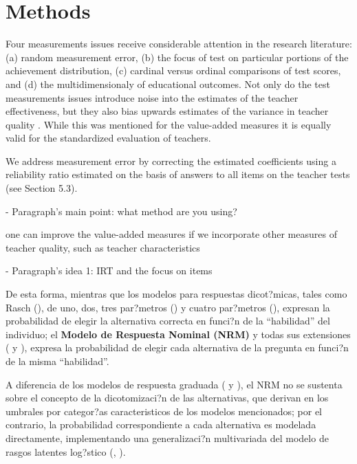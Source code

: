 \section{Methods}

Four measurements issues receive considerable attention in the research literature: (a) random measurement error, (b) the focus of test on particular portions of the achievement distribution, (c) cardinal versus ordinal comparisons of test scores, and (d) the multidimensionaly of educational outcomes. Not only do the test measurements issues introduce noise into the estimates of the teacher effectiveness, but they also bias upwards estimates of the variance in teacher quality \citep{Hanushek_et_al_2012}. While this was mentioned for the value-added measures it is equally valid for the standardized evaluation of teachers.


We address measurement error by correcting the estimated coefficients using a reliability ratio estimated on the basis of answers to all items on the teacher tests (see Section 5.3).


- Paragraph's main point: what method are you using?

one can improve the value-added measures if we incorporate other measures of teacher quality, such as teacher characteristics \citep{Chetty_et_al_2014a}

- Paragraph's idea 1: IRT and the focus on items

De esta forma, mientras que los modelos para respuestas dicot?micas, tales como Rasch (\citealp{Rasch1980}), de uno, dos, tres par?metros (\citealp{Lord_Nov2008}) y cuatro par?metros (\citealp{McDonald1967}), expresan la probabilidad de elegir la alternativa correcta en funci?n de la ``habilidad'' del individuo; el \textbf{Modelo de Respuesta Nominal (NRM)} y todas sus extensiones (\citealt{Bock1972}  y \citealt[cap?tulo 2]{Linden1997}), expresa la probabilidad de elegir cada alternativa de la pregunta en funci?n de la misma ``habilidad''.

A diferencia de los modelos de respuesta graduada (\citealt{Samejima1969, Samejima1972} y \citealt[cap?tulo 5]{Ham_Swam1991}), el NRM no se sustenta sobre el concepto de la dicotomizaci?n de las alternativas, que derivan en los umbrales por categor?as caracteristicos de los modelos mencionados; por el contrario, la probabilidad correspondiente a cada alternativa es modelada directamente, implementando una generalizaci?n multivariada del modelo de rasgos latentes log?stico (\citealt{Bock1972}, \citealt{Ostini2006}).



